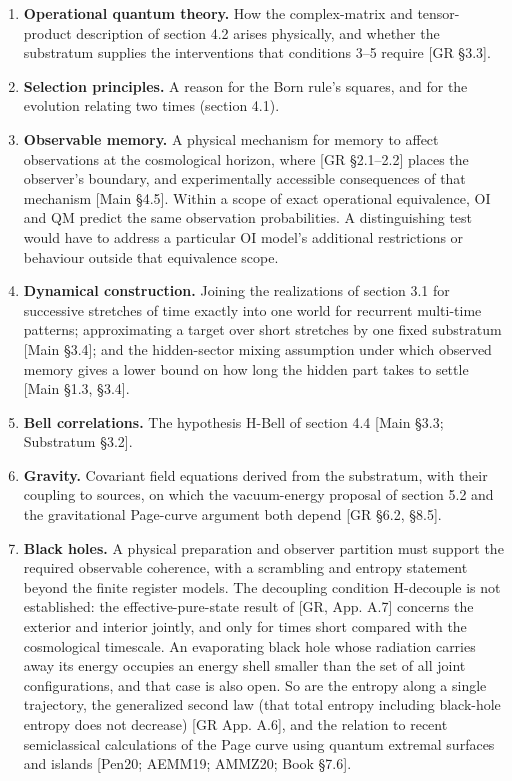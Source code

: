 \documentclass[
]{article}
\providecommand{\tightlist}{%
  \setlength{\itemsep}{0pt}\setlength{\parskip}{0pt}}
\begin{document}
\begin{enumerate}
\def\labelenumi{\arabic{enumi}.}
\tightlist
\item
  \textbf{Operational quantum theory.} How the complex-matrix and
  tensor-product description of section 4.2 arises physically, and
  whether the substratum supplies the interventions that conditions 3--5
  require {[}GR §3.3{]}.
\item
  \textbf{Selection principles.} A reason for the Born rule's squares,
  and for the evolution relating two times (section 4.1).
\item
  \textbf{Observable memory.} A physical mechanism for memory to affect
  observations at the cosmological horizon, where {[}GR §2.1--2.2{]}
  places the observer's boundary, and experimentally accessible
  consequences of that mechanism {[}Main §4.5{]}. Within a scope of
  exact operational equivalence, OI and QM predict the same observation
  probabilities. A distinguishing test would have to address a
  particular OI model's additional restrictions or behaviour outside
  that equivalence scope.
\item
  \textbf{Dynamical construction.} Joining the realizations of section
  3.1 for successive stretches of time exactly into one world for
  recurrent multi-time patterns; approximating a target over short
  stretches by one fixed substratum {[}Main §3.4{]}; and the
  hidden-sector mixing assumption under which observed memory gives a
  lower bound on how long the hidden part takes to settle {[}Main §1.3,
  §3.4{]}.
\item
  \textbf{Bell correlations.} The hypothesis H-Bell of section 4.4
  {[}Main §3.3; Substratum §3.2{]}.
\item
  \textbf{Gravity.} Covariant field equations derived from the
  substratum, with their coupling to sources, on which the vacuum-energy
  proposal of section 5.2 and the gravitational Page-curve argument both
  depend {[}GR §6.2, §8.5{]}.
\item
  \textbf{Black holes.} A physical preparation and observer partition
  must support the required observable coherence, with a scrambling and
  entropy statement beyond the finite register models. The decoupling
  condition H-decouple is not established: the effective-pure-state
  result of {[}GR, App. A.7{]} concerns the exterior and interior
  jointly, and only for times short compared with the cosmological
  timescale. An evaporating black hole whose radiation carries away its
  energy occupies an energy shell smaller than the set of all joint
  configurations, and that case is also open. So are the entropy along a
  single trajectory, the generalized second law (that total entropy
  including black-hole entropy does not decrease) {[}GR App. A.6{]}, and
  the relation to recent semiclassical calculations of the Page curve
  using quantum extremal surfaces and islands {[}Pen20; AEMM19; AMMZ20;
  Book §7.6{]}.
\end{enumerate}
\end{document}
